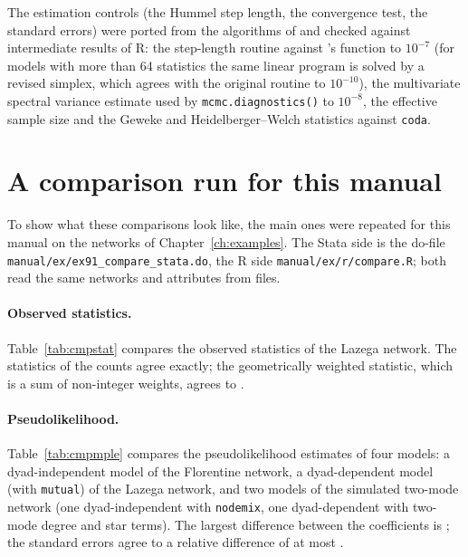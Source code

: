 The estimation controls (the Hummel step length, the convergence test, the standard errors) were ported from the algorithms of \ergm{} and checked against intermediate results of R: the step-length routine against \ergm{}'s function to $10^{-7}$ (for models with more than 64 statistics the same linear program is solved by a revised simplex, which agrees with the original routine to $10^{-10}$), the multivariate spectral variance estimate used by \texttt{mcmc.diagnostics()} to $10^{-8}$, the effective sample size and the Geweke and Heidelberger--Welch statistics against \texttt{coda}.

\section{A comparison run for this manual}\label{sec:cmpmanual}

To show what these comparisons look like, the main ones were repeated for this manual on the networks of Chapter~\ref{ch:examples}. The Stata side is the do-file \texttt{manual/ex/ex91\_compare\_stata.do}, the R side \texttt{manual/ex/r/compare.R}; both read the same networks and attributes from files.

\paragraph{Observed statistics.} Table~\ref{tab:cmpstat} compares the observed statistics of the Lazega network. The statistics of the counts agree exactly; the geometrically weighted statistic, which is a sum of non-integer weights, agrees to \cmpStatMax.

\paragraph{Pseudolikelihood.} Table~\ref{tab:cmpmple} compares the pseudolikelihood estimates of four models: a dyad-independent model of the Florentine network, a dyad-dependent model (with \texttt{mutual}) of the Lazega network, and two models of the simulated two-mode network (one dyad-independent with \texttt{nodemix}, one dyad-dependent with two-mode degree and star terms). The largest difference between the coefficients is \cmpMpleMax{}; the standard errors agree to a relative difference of at most \cmpSeRel.


